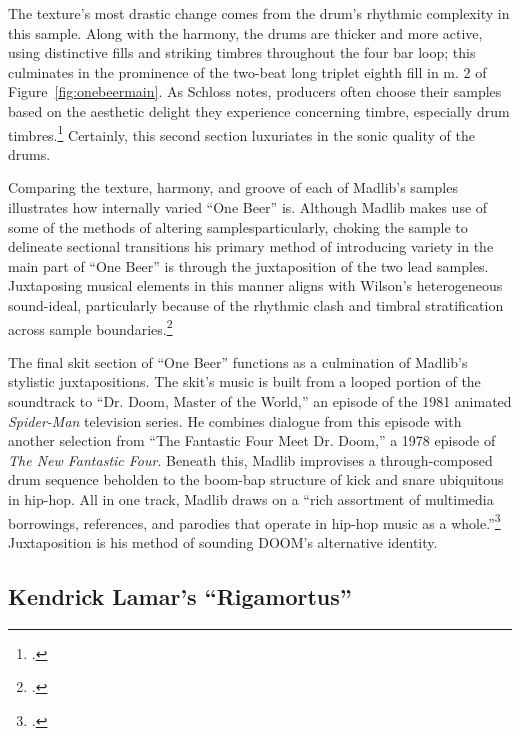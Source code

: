 The texture's most drastic change comes from the drum's rhythmic complexity in this sample.
Along with the harmony, the drums are thicker and more active, using distinctive fills and 
striking timbres throughout the four bar loop; this culminates in the prominence of the 
two-beat long triplet eighth fill in m. 2 of Figure~\ref{fig:onebeermain}. As Schloss notes,
producers often choose their samples based on the aesthetic delight they experience concerning
timbre, especially drum timbres.\footnote{
    \autocite[141--143]{josephgschlossMakingBeatsArt2004}.} 
Certainly, this second section luxuriates in the sonic quality of the drums.

Comparing the texture, harmony, and groove of each of Madlib's samples illustrates how internally
varied ``One Beer'' is. Although Madlib makes use of some of the methods of altering 
samples\textemdash particularly, choking the sample to delineate sectional transitions\textemdash
his primary method of introducing variety in the main part of ``One Beer'' is through the 
juxtaposition of the two lead samples. Juxtaposing musical elements in this manner aligns with 
Wilson's heterogeneous sound-ideal, particularly because of the  rhythmic clash and  timbral
stratification across sample boundaries.\footnote{
    \autocite[329--329]{ollywilsonHeterogeneousSoundIdeal1992}.}

The final skit section of ``One Beer'' functions as a culmination of Madlib's stylistic 
juxtapositions. The skit's music is built from a looped portion of the soundtrack to ``Dr. Doom,
Master of the World,''  an episode of the 1981 animated \textit{Spider-Man} television series. He
combines dialogue from this episode with another selection from ``The Fantastic Four Meet Dr. 
Doom,'' a 1978 episode of \textit{The New Fantastic Four}. Beneath this, Madlib improvises a 
through-composed drum sequence beholden to the boom-bap structure of kick and snare ubiquitous
in hip-hop. All in one track, Madlib draws on a ``rich assortment of multimedia borrowings, 
references, and parodies that operate in hip-hop music as a whole.''\footnote{
    \autocite[42]{joannademersSampling1970sHipHop2003}.} 
Juxtaposition is his method  of sounding DOOM's alternative identity.

\subsection*{\centering Kendrick Lamar's ``Rigamortus''}


